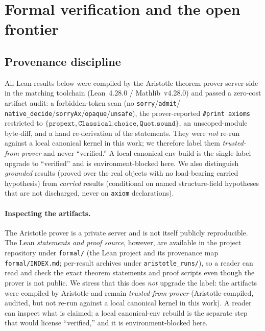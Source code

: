 \documentclass[11pt]{article}
\newcommand{\tfp}{\emph{trusted-from-prover}}
\begin{document}
\section{Formal verification and the open frontier}\label{sec:formal}

\subsection{Provenance discipline}
All Lean results below were compiled by the Aristotle theorem prover server-side
in the matching toolchain (Lean~4.28.0 / Mathlib~v4.28.0) and passed a zero-cost
artifact audit: a forbidden-token scan (no \texttt{sorry}/\texttt{admit}/
\texttt{native\_decide}/\texttt{sorryAx}/\texttt{opaque}/\texttt{unsafe}), the
prover-reported \texttt{\#print axioms} restricted to
$\{\texttt{propext},\texttt{Classical.choice},\texttt{Quot.sound}\}$, an
unscoped-module byte-diff, and a hand re-derivation of the statements. They were
\emph{not} re-run against a local canonical kernel in this work; we therefore
label them \tfp{} and never ``verified.'' A local canonical-env build is the
single label upgrade to ``verified'' and is environment-blocked here. We also
distinguish \emph{grounded} results (proved over the real objects with no
load-bearing carried hypothesis) from \emph{carried} results (conditional on
named structure-field hypotheses that are not discharged, never on \texttt{axiom}
declarations).

\paragraph{Inspecting the artifacts.}
The Aristotle prover is a private server and is not itself publicly reproducible.
The Lean \emph{statements and proof source}, however, are available in the
project repository under \texttt{formal/} (the Lean project and its provenance
map \texttt{formal/INDEX.md}; per-result archives under
\texttt{aristotle\_runs/}), so a reader can read and check the exact theorem
statements and proof scripts even though the prover is not public. We stress that
this does \emph{not} upgrade the label: the artifacts were compiled by Aristotle
and remain \tfp{} (Aristotle-compiled, audited, but not re-run against a local
canonical kernel in this work). A reader can inspect what is claimed; a local
canonical-env rebuild is the separate step that would license ``verified,'' and
it is environment-blocked here.
\end{document}
